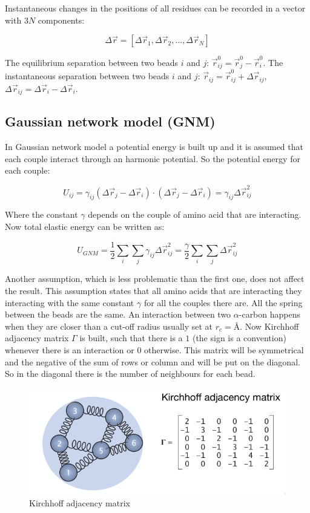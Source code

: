 Instantaneous changes in the positions of all residues can be recorded in a vector with $3N$ components:

$$\Delta\vec{r} = [\Delta\vec{r}_1, \Delta\vec{r}_2, \dots, \Delta\vec{r}_N]$$


The equilibrium separation between two beads $i$ and $j$: $\vec{r}_{ij}^0 = \vec{r}_j^0-\vec{r}_i^0$.
The instantaneous separation between two beads $i$ and $j$: $\vec{r}_{ij} = \vec{r}_{ij}^0+\Delta\vec{r}_{ij}$, $\Delta\vec{r}_{ij} = \Delta\vec{r}_i-\Delta\vec{r}_i$.

	\subsection{Gaussian network model (GNM)}
	In Gaussian network model a potential energy is built up and it is assumed that each couple interact through an harmonic potential.
	So the potential energy for each couple:

	$$U_{ij} = \gamma_{ij}(\Delta\vec{r}_j-\Delta\vec{r}_i)\cdot(\Delta\vec{r}_j-\Delta\vec{r}_i) = \gamma_{ij}\Delta\vec{r}_{ij}^2$$

	Where the constant $\gamma$ depends on the couple of amino acid that are interacting.
	Now total elastic energy can be written as:

	$$U_{GNM} = \frac{1}{2}\sum\limits_i\sum\limits_j\gamma_{ij}\Delta\vec{r}^2_{ij} = \frac{\gamma}{2}\sum\limits_i\sum\limits_j\Delta\vec{r}_{ij}^2$$

	Another assumption, which is less problematic than the first one, does not affect the result.
	This assumption states that all amino acids that are interacting they interacting with the same constant $\gamma$ for all the couples there are.
	All the spring between the beads are the same.
	An interaction between two $\alpha$-carbon happens when they are closer than a cut-off radius usually set at $r_c = \si{\angstrom}$.
	Now Kirchhoff adjacency matrix $\Gamma$ is built, such that there is a $1$ (the sign is a convention) whenever there is an interaction or $0$ otherwise.
	This matrix will be symmetrical and the negative of the sum of rows or column and will be put on the diagonal.
	So in the diagonal there is the number of neighbours for each bead.

	\begin{figure}[H]
		\includegraphics[width=\textwidth]{kirchoff-adjacency-matrix}
		\caption{Kirchhoff adjacency matrix}
		\label{fig:kirchhoff-adjacency}
	\end{figure}

